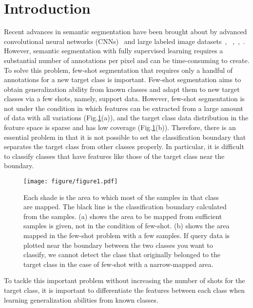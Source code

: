 \documentclass[runningheads]{llncs}
\begin{document}
\section{Introduction}
Recent advances in semantic segmentation have been brought about by advanced convolutional neural networks (CNNs)~\cite{DNN} and large labeled image datasets~\cite{pascal}, ~\cite{coco},~\cite{city},~\cite{ade}.
However, semantic segmentation with fully supervised learning requires a substantial number of annotations per pixel and can be time-consuming to create.
To solve this problem, few-shot segmentation that requires only a handful of annotations for a new target class is important.
Few-shot segmentation aims to obtain generalization ability from known classes and adapt them to new target classes via a few shots, namely, support data.
However, few-shot segmentation is not under the condition in which features can be extracted from a large amount of data with all variations (Fig.\ref{fig:fg1}(a)), and the target class data distribution in the feature space is sparse and has low coverage (Fig.\ref{fig:fg1}(b)).
Therefore, there is an essential problem in that it is not possible to set the classification boundary that separates the target class from other classes properly. In particular, it is difficult to classify classes that have features like those of the target class near the boundary.
\begin{figure}[h]
  \texttt{[image: figure/figure1.pdf]}
  \caption{Each shade is the area to which most of the samples in that class are mapped. The black line is the classification boundary calculated from the samples.
  (a) shows the area to be mapped from sufficient samples is given, not in the condition of few-shot. (b) shows the area mapped in the few-shot problem with a few samples.
  If query data is plotted near the boundary between the two classes you want to classify, we cannot detect the class that originally belonged to the target class in the case of few-shot with a narrow-mapped area.
  \label{fig:fg1}
}
\end{figure}
To tackle this important problem without increasing the number of shots for the target class, it is important to differentiate the features between each class 
when learning generalization abilities from known classes.
\end{document}
